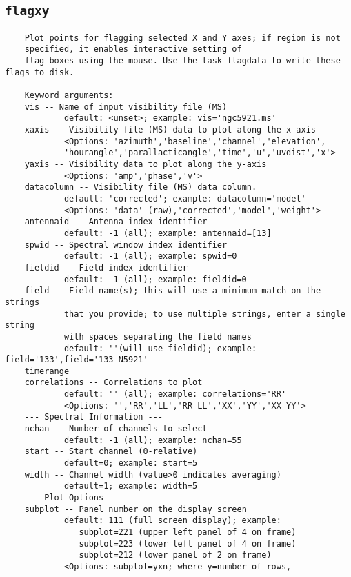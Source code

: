 \subsection{{\tt flagxy}}
\label{section:tasks.flagxy}

\small
\begin{verbatim}
    Plot points for flagging selected X and Y axes; if region is not
    specified, it enables interactive setting of  
    flag boxes using the mouse. Use the task flagdata to write these flags to disk.
    
    Keyword arguments:
    vis -- Name of input visibility file (MS)
            default: <unset>; example: vis='ngc5921.ms'
    xaxis -- Visibility file (MS) data to plot along the x-axis
            <Options: 'azimuth','baseline','channel','elevation',
            'hourangle','parallacticangle','time','u','uvdist','x'>
    yaxis -- Visibility data to plot along the y-axis
            <Options: 'amp','phase','v'>
    datacolumn -- Visibility file (MS) data column.
            default: 'corrected'; example: datacolumn='model'
            <Options: 'data' (raw),'corrected','model','weight'>
    antennaid -- Antenna index identifier
            default: -1 (all); example: antennaid=[13]
    spwid -- Spectral window index identifier
            default: -1 (all); example: spwid=0
    fieldid -- Field index identifier
            default: -1 (all); example: fieldid=0
    field -- Field name(s); this will use a minimum match on the strings
            that you provide; to use multiple strings, enter a single string
            with spaces separating the field names
            default: ''(will use fieldid); example: field='133',field='133 N5921'
    timerange
    correlations -- Correlations to plot
            default: '' (all); example: correlations='RR'
            <Options: '','RR','LL','RR LL','XX','YY','XX YY'>
    --- Spectral Information ---
    nchan -- Number of channels to select
            default: -1 (all); example: nchan=55
    start -- Start channel (0-relative)
            default=0; example: start=5
    width -- Channel width (value>0 indicates averaging)
            default=1; example: width=5
    --- Plot Options ---
    subplot -- Panel number on the display screen
            default: 111 (full screen display); example:
               subplot=221 (upper left panel of 4 on frame)
               subplot=223 (lower left panel of 4 on frame)
               subplot=212 (lower panel of 2 on frame)
            <Options: subplot=yxn; where y=number of rows,

\end{verbatim}
